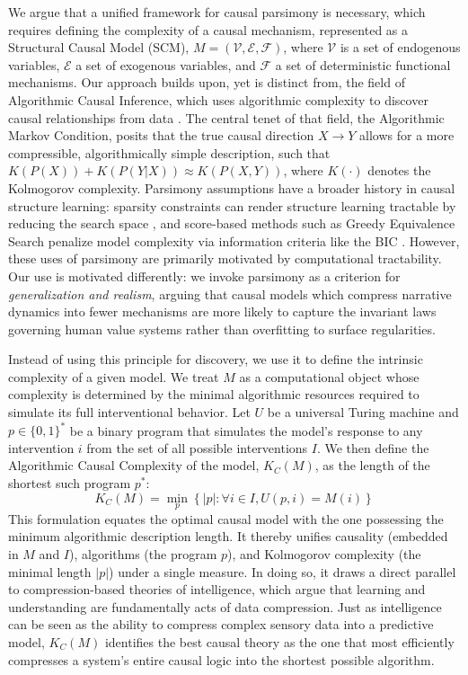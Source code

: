 \documentclass{article}
\theoremstyle{plain}
\theoremstyle{definition}
\theoremstyle{remark}
\begin{document}
We argue that a unified framework for causal parsimony is necessary, which requires defining the complexity of a causal mechanism, represented as a Structural Causal Model (SCM), $M = (\mathcal{V}, \mathcal{E}, \mathcal{F})$, where $\mathcal{V}$ is a set of endogenous variables, $\mathcal{E}$ a set of exogenous variables, and $\mathcal{F}$ a set of deterministic functional mechanisms. Our approach builds upon, yet is distinct from, the field of Algorithmic Causal Inference, which uses algorithmic complexity to discover causal relationships from data \cite{janzing10}. The central tenet of that field, the Algorithmic Markov Condition, posits that the true causal direction $X \to Y$ allows for a more compressible, algorithmically simple description, such that $K(P(X)) + K(P(Y|X)) \approx K(P(X,Y))$, where $K(\cdot)$ denotes the Kolmogorov complexity. Parsimony assumptions have a broader history in causal structure learning: sparsity constraints can render structure learning tractable by reducing the search space \cite{claassen13}, and score-based methods such as Greedy Equivalence Search penalize model complexity via information criteria like the BIC \cite{chickering02}. However, these uses of parsimony are primarily motivated by computational tractability. Our use is motivated differently: we invoke parsimony as a criterion for \textit{generalization and realism}, arguing that causal models which compress narrative dynamics into fewer mechanisms are more likely to capture the invariant laws governing human value systems rather than overfitting to surface regularities.

Instead of using this principle for discovery, we use it to define the intrinsic complexity of a given model. We treat $M$ as a computational object whose complexity is determined by the minimal algorithmic resources required to simulate its full interventional behavior. Let $U$ be a universal Turing machine and $p \in \{0,1\}^*$ be a binary program that simulates the model's response to any intervention $i$ from the set of all possible interventions $I$. We then define the Algorithmic Causal Complexity of the model, $K_C(M)$, as the length of the shortest such program $p^*$:
\begin{equation}
    K_C(M) = \min_{p} \left\{ |p| : \forall i \in I, U(p, i) = M(i) \right\}
\end{equation}
This formulation equates the optimal causal model with the one possessing the minimum algorithmic description length. It thereby unifies causality (embedded in $M$ and $I$), algorithms (the program $p$), and Kolmogorov complexity (the minimal length $|p|$) under a single measure. In doing so, it draws a direct parallel to compression-based theories of intelligence, which argue that learning and understanding are fundamentally acts of data compression. Just as intelligence can be seen as the ability to compress complex sensory data into a predictive model, $K_C(M)$ identifies the best causal theory as the one that most efficiently compresses a system's entire causal logic into the shortest possible algorithm.
\end{document}

